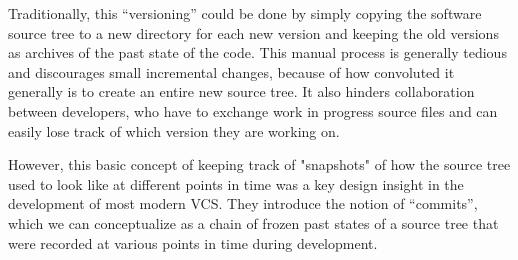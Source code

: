 Traditionally, this ``versioning'' could be done by simply copying the software
source tree to a new directory for each new version and keeping the old
versions as archives of the past state of the code. This manual process is
generally tedious and discourages small incremental changes, because of how
convoluted it generally is to create an entire new source tree. It also hinders
collaboration between developers, who have to exchange work in progress source
files and can easily lose track of which version they are working on.

However, this basic concept of keeping track of "snapshots" of how the source
tree used to look like at different points in time was a key design insight in
the development of most modern \gls{VCS}. They introduce the notion of
``commits'', which we can conceptualize as a chain of frozen past states of a
source tree that were recorded at various points in time during development.
